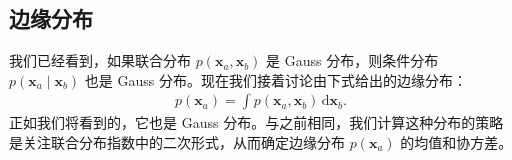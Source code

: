 \documentclass[../../main.tex]{subfiles}
\begin{document}
\subsection{边缘分布}\label{subsection:ch03-边缘分布}

我们已经看到，如果联合分布 $p(\boldsymbol{x}_{a},\boldsymbol{x}_{b})$ 是 Gauss 分布，则条件分布 $p(\boldsymbol{x}_{a}\mid\boldsymbol{x}_{b})$ 也是 Gauss 分布。现在我们接着讨论由下式给出的边缘分布：
\begin{align}
p(\boldsymbol{x}_{a})=\int p(\boldsymbol{x}_{a},\boldsymbol{x}_{b})\,\mathrm{d}\boldsymbol{x}_{b}.
\label{align:ch03-边缘积分}
\end{align}
正如我们将看到的，它也是 Gauss 分布。与之前相同，我们计算这种分布的策略是关注联合分布指数中的二次形式，从而确定边缘分布 $p(\boldsymbol{x}_{a})$ 的均值和协方差。
\end{document}

